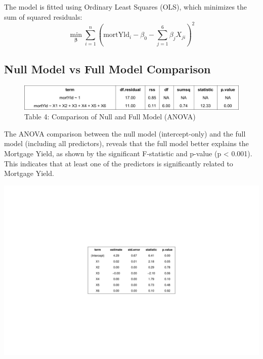 \documentclass[
  12pt,
]{article}
\begin{document}
\vspace{0.2cm}

The model is fitted using Ordinary Least Squares (OLS), which minimizes
the sum of squared residuals:\\
\vspace{-0.2cm} \[
\min_{\boldsymbol\beta} \sum_{i=1}^n \left( \text{mortYld}_i - \beta_0 - \sum_{j=1}^6 \beta_j X_{ji} \right)^2
\] \vspace{-0.3cm}

\subsection{Null Model vs Full Model
Comparison}\label{null-model-vs-full-model-comparison}

\vspace{-0.5cm}
\begin{figure}[H]
\centering
\includegraphics[width=1.0\textwidth]{figures/Table 2.png}
\captionsetup{font=normalsize}
\caption*{Table 4: Comparison of Null and Full Model (ANOVA)}
\end{figure}
\vspace{-0.5cm}

The ANOVA comparison between the null model (intercept-only) and the
full model (including all predictors), reveals that the full model
better explains the Mortgage Yield, as shown by the significant
F-statistic and p-value (p \textless{} 0.001). This indicates that at
least one of the predictors is significantly related to Mortgage Yield.

\includegraphics{report1_r1_files/figure-latex/unnamed-chunk-4-1.pdf}
\end{document}
